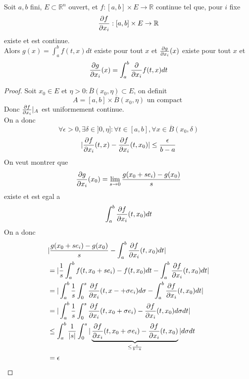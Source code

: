 \documentclass[../main.tex]{subfiles}
\begin{document}
\begin{thm}
	Soit $a,b$ fini, $E\subset \mathbb{R}^n$ ouvert, et $f: [ a,b] \times E \to \mathbb{R}$ continue tel que, pour $i$ fixe
	\[ 
	\frac{\partial f}{\partial x_i} : [ a,b] \times E \to \mathbb{R}
	\]
	existe et est continue.\\
	Alors $g( x) = \int_{ a }^{ b }f( t,x) dt$ existe pour tout $x$ et
	$\frac{\partial g}{\partial x_i}( x) $ existe pour tout $x$ et
	\[ 
		\frac{\partial g}{\partial x_i}( x) = \int_{ a }^{ b }\frac{\partial }{\partial x_i}f( t,x) dt
	\]
\end{thm}
\begin{proof}
	Soit $x_0 \in E$ et $\eta >0: \overline{B}( x_0,\eta) \subset E$, on definit
	\[ 
		A= [ a,b] \times \overline{B}( x_0,\eta)  \text{ un compact } 
	\]
	Donc $ \frac{\partial f}{\partial x_i}|_A$ est uniformement continue.\\
	On a donc 
	\[ 
		\forall \epsilon>0, \exists \delta\in ]0,\eta ]: \forall t \in [ a,b] , \forall x \in \overline{B}( x_0,\delta) 
	\]
	\[ 
		| \frac{\partial f}{\partial x_i}( t,x) - \frac{\partial f}{\partial x_i}( t,x_0) | \leq \frac{\epsilon}{b-a}
	\]
	On veut montrer que
	\[ 
		\frac{\partial g}{\partial x_i}( x_0) = \lim_{s \to 0}  \frac{g( x_0 + s e_i)- g( x_0) }{s}	
	\]
	existe et est egal a 
	\[ 
		\int_{ a }^{ b } \frac{\partial f}{\partial x_i}( t,x_0) dt
	\]
	On a donc
	\begin{align*}
	&| \frac{g( x_0+ se_i) - g( x_0) }{s} - \int_{ a }^{ b } \frac{\partial f}{\partial x_i} ( t,x_0)  dt| \\
	&= | \frac{1}{s} \int_{ a }^{ b } f( t, x_0+ se_i) - f( t,x_0) dt - \int_{  a }^{ b } \frac{\partial f}{\partial x_i}( t,x_0) dt|\\
	&= | \int_{ a }^{ b }\frac{1}{s} \int_{ 0 }^{ s } \frac{\partial f}{\partial x_i}( t,x-+ \sigma e_i)  d\sigma - \int_{ a }^{ b } \frac{\partial f}{\partial x_i} ( t,x_0) dt|\\
	&= | \int_{ a }^{ b } \frac{1}{s} \int_{ 0 }^{ s } \frac{\partial f}{\partial x_i }( t,x_0+ \sigma e_i) - \frac{\partial f}{\partial x_i}( t,x_0) d\sigma dt|\\
	&\leq \int_{ a }^{ b } \frac{1}{|s|} \int_{ 0 }^{ s } | \underbrace{\frac{\partial f}{\partial x_i}( t,x_0+ \sigma e_i)  - \frac{\partial f}{\partial x_i}( t,x_0) }_{\leq \frac{\epsilon}{b-a}	}| d\sigma dt \\
	&= \epsilon	
	\end{align*}
	
	
	
	
\end{proof}
\end{document}

